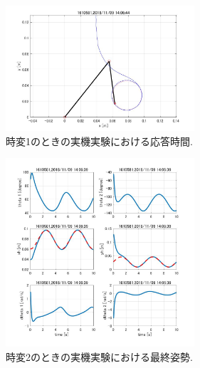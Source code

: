 \documentclass[twocolumn, 10pt,a4j]{jsarticle}
\begin{document}
\begin{enumerate}
        \begin{figure}[H]
          \begin{center}
            \includegraphics[width=7cm]{../img/kadai45/jpg_zissai_hand_zihen_auto_zikan_1.jpg}
            \caption{時変1のときの実機実験における応答時間.}
          \end{center}
        \end{figure}
        \begin{figure}[H]
          \begin{center}
            \includegraphics[width=7cm]{../img/kadai45/jpg_zissai_hand_zihen_saisyu_sise_1.jpg}
            \caption{時変2のときの実機実験における最終姿勢.}
          \end{center}
        \end{figure}
        

\end{enumerate}
\end{document}
